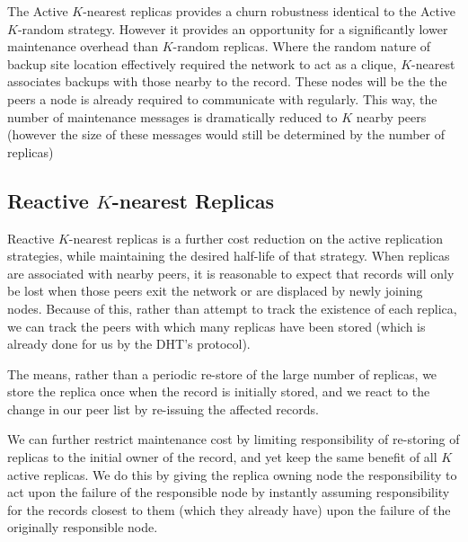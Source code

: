 The Active $K$-nearest replicas provides a churn robustness identical to the Active $K$-random strategy.
However it provides an opportunity for a significantly lower maintenance overhead than $K$-random replicas.
Where the random nature of backup site location effectively required the network to act as a clique, $K$-nearest associates backups with those nearby to the record.
These nodes will be the  the peers a node is already required to communicate with regularly.
This way, the number of maintenance messages is dramatically reduced to $K$ nearby peers (however the size of these messages would still be determined by the number of replicas)

\subsection{Reactive $K$-nearest Replicas}
Reactive $K$-nearest replicas is a further cost reduction on the active replication strategies, while maintaining the desired half-life of that strategy.
When replicas are associated with nearby peers, it is reasonable to expect that records will only be lost when those peers exit the network or are displaced by newly joining nodes.
Because of this, rather than attempt to track the existence of each replica, we can track the peers with which many replicas have been stored (which is already done for us by the DHT's protocol).

The means, rather than a periodic re-store of the large number of replicas, we store the replica once when the record is initially stored, and we react to the change in our peer list by re-issuing the affected records.

We can further restrict maintenance cost by limiting responsibility of re-storing of replicas to the initial owner of the record, and yet keep the same benefit of all $K$ active replicas.
We do this by giving the replica owning node the responsibility to act upon the failure of the responsible node by instantly assuming responsibility for the records closest to them (which they already have) upon the failure of the originally responsible node.


